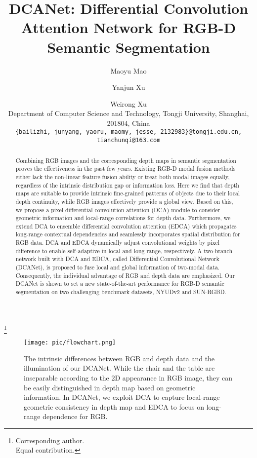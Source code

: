 \documentclass[10pt,twocolumn,letterpaper]{article}
\begin{document}
\title{DCANet: Differential Convolution Attention Network for RGB-D Semantic Segmentation}








\author{ \and
\and
\and
\and
Maoyu Mao\and
Yanjun Xu\and
Weirong Xu\\
Department of Computer Science and Technology, Tongji University, Shanghai, 201804, China\\
{\tt\small \{bailizhi, junyang, yaoru, maomy, jesse, 2132983\}@tongji.edu.cn, tianchunqi@163.com}
}



\maketitle
\footnote{
{} Corresponding author. \\
{} Equal contribution.}

\begin{abstract}
   Combining RGB images and the corresponding depth maps in semantic segmentation proves the effectiveness in the past
   few years. Existing RGB-D modal fusion methods either lack the non-linear feature fusion ability or treat both modal
   images equally, regardless of the intrinsic distribution gap or information loss. Here we find that depth maps are suitable to provide intrinsic fine-grained patterns of objects due to their local depth continuity, while RGB images
   effectively provide a global view. Based on this, we propose a pixel differential convolution attention (DCA) module
   to consider geometric information and local-range correlations for depth data. Furthermore, we extend DCA to ensemble
   differential convolution attention (EDCA) which propagates long-range contextual dependencies and seamlessly
   incorporates spatial distribution for RGB data. DCA and EDCA dynamically adjust convolutional weights by
   pixel difference to enable self-adaptive in local and long range, respectively. A two-branch network built with DCA
   and EDCA, called Differential Convolutional Network (DCANet), is proposed to fuse local and global information
   of two-modal data. Consequently, the individual advantage of RGB and depth data are emphasized. Our DCANet is shown
   to set a new state-of-the-art performance for RGB-D semantic segmentation on two challenging benchmark datasets,
    NYUDv2 and SUN-RGBD.
\end{abstract}


\begin{figure}
   \centering
   \texttt{[image: pic/flowchart.png]}
   \caption{The intrinsic differences between RGB and depth data and the illumination of our DCANet.
      While the chair and the table are inseparable according to the 2D appearance in RGB image, they can be easily
      distinguished in depth map based on geometric information. In DCANet, we exploit DCA to
      capture local-range geometric consistency in depth map and EDCA to focus on long-range dependence for RGB.
   }
   \label{hard_sample2}
\end{figure}
\end{document}
